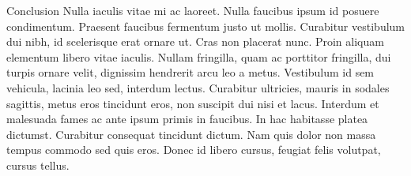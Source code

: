Conclusion Nulla iaculis vitae mi ac laoreet. Nulla faucibus ipsum id posuere condimentum. Praesent faucibus fermentum justo ut mollis. Curabitur vestibulum dui nibh, id scelerisque erat ornare ut. Cras non placerat nunc. Proin aliquam elementum libero vitae iaculis. Nullam fringilla, quam ac porttitor fringilla, dui turpis ornare velit, dignissim hendrerit arcu leo a metus. Vestibulum id sem vehicula, lacinia leo sed, interdum lectus. Curabitur ultricies, mauris in sodales sagittis, metus eros tincidunt eros, non suscipit dui nisi et lacus. Interdum et malesuada fames ac ante ipsum primis in faucibus. In hac habitasse platea dictumst. Curabitur consequat tincidunt dictum. Nam quis dolor non massa tempus commodo sed quis eros. Donec id libero cursus, feugiat felis volutpat, cursus tellus.